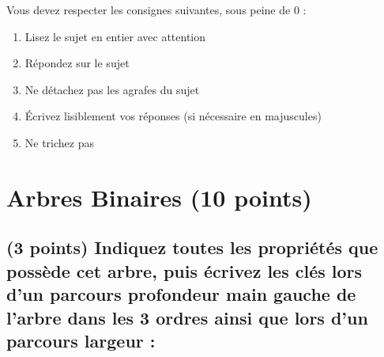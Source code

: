 \documentclass[11pt,a4paper]{article}
\begin{document}
\MakeExamTitle                   %


\bigskip

Vous devez respecter les consignes suivantes, sous peine de 0 :

\begin{enumerate}[label=\Roman*)]
\item Lisez le sujet en entier avec attention
\item Répondez sur le sujet
\item Ne détachez pas les agrafes du sujet
\item \'Ecrivez lisiblement vos réponses (si nécessaire en majuscules)
\item Ne trichez pas
\end{enumerate}


\vfillFirst

\section{Arbres Binaires (10 points)}

\subsection{(3 points) Indiquez toutes les propriétés que possède cet arbre, puis écrivez les clés lors d'un parcours profondeur main gauche de l'arbre dans les 3 ordres ainsi que lors d'un parcours largeur : }
\end{document}

